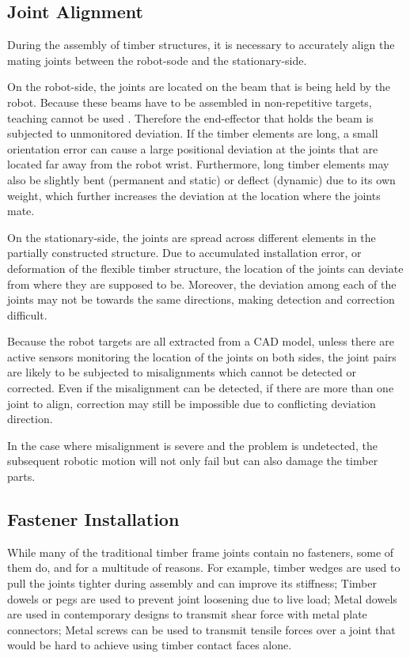 \subsection{Joint Alignment}
\label{subsection:challenges-joint-alignment}

During the assembly of timber structures, it is necessary to accurately align the mating joints between the robot-sode and the stationary-side.

On the robot-side, the joints are located on the beam that is being held by the robot. Because these beams have to be assembled in non-repetitive targets, teaching cannot be used . Therefore the end-effector that holds the beam is subjected to unmonitored deviation. If the timber elements are long, a small orientation error can cause a large positional deviation at the joints that are located far away from the robot wrist. Furthermore, long timber elements may also be slightly bent (permanent and static) or deflect (dynamic) due to its own weight, which further increases the deviation at the location where the joints mate.

On the stationary-side, the joints are spread across different elements in the partially constructed structure. Due to accumulated installation error, or deformation of the flexible timber structure, the location of the joints can deviate from where they are supposed to be. Moreover, the deviation among each of the joints may not be towards the same directions, making detection and correction difficult.

Because the robot targets are all extracted from a CAD model, unless there are active sensors monitoring the location of the joints on both sides, the joint pairs are likely to be subjected to misalignments which cannot be detected or corrected. Even if the misalignment can be detected, if there are more than one joint to align, correction may still be impossible due to conflicting deviation direction.

In the case where misalignment is severe and the problem is undetected, the subsequent robotic motion will not only fail but can also damage the timber parts. 

\subsection{Fastener Installation}
\label{subsection:challenges-fastener-installation}

While many of the traditional timber frame joints contain no fasteners, some of them do, and for a multitude of reasons. For example, timber wedges are used to pull the joints tighter during assembly and can improve its stiffness; Timber dowels or pegs are used to prevent joint loosening due to live load; Metal dowels are used in contemporary designs to transmit shear force with metal plate connectors; Metal screws can be used to transmit tensile forces over a joint that would be hard to achieve using timber contact faces alone. 

